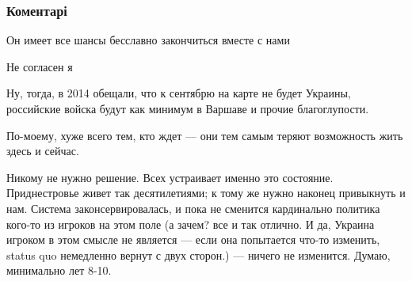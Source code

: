  
 
 
 
 
\subsubsection{Коментарі}

\begin{itemize}
 
Он имеет все шансы бесславно закончиться вместе с нами

 
Не согласен я

 

Ну, тогда, в 2014 обещали, что к сентябрю на карте не будет Украины, российские
войска будут как минимум в Варшаве \Smiley[1.0][yellow] и прочие благоглупости.

По-моему, хуже всего тем, кто ждет — они тем самым теряют возможность жить
здесь и сейчас.

Никому не нужно решение. Всех устраивает именно это состояние. Приднестровье
живет так десятилетиями; к тому же нужно наконец привыкнуть и нам. Система
законсервировалась, и пока не сменится кардинально политика кого-то из игроков
на этом поле (а зачем? все и так отлично. И да, Украина игроком в этом смысле
не является — если она попытается что-то изменить, status quo немедленно вернут
с двух сторон.) — ничего не изменится. Думаю, минимально лет 8-10.


\end{itemize}
